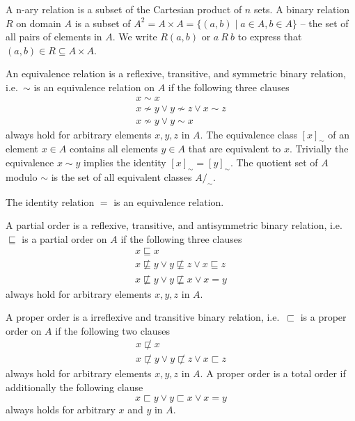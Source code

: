 \begin{definition}
	A n-ary relation is a subset of the Cartesian product of $n$ sets.
	A {\myem binary relation} $R$ on domain $A$ 
	is a subset of $A^2 = A \times A = \{ (a,b) \mid a\in A, b\in A \}$ -- 
	the set of all pairs of elements in $A$.
	We write $R(a,b)$ or $a\ R\ b$ to express that $(a,b)\in R \subseteq A\times A$.
\end{definition}
\begin{definition}
	An {\myem equivalence relation} 
	is a reflexive, transitive, and symmetric binary relation, 
	i.e.~$\sim$ is an equivalence relation on $A$ if the following three clauses
	\begin{align*}
	x\sim x
	\tag*{reflexivivity}
	\\
	x\not\sim y \lor  y \not\sim z \lor x\sim z
	\tag*{transitivity}
	\\
	x\not\sim y \lor y\sim x
	\tag*{symmetry}
	\end{align*}
	always hold for arbitrary elements $x,y,z$ in $A$.
	The {\myem equivalence class} $[x]_\sim$
	of an element $x\in A$ contains all elements $y\in A$ that are equivalent to $x$.
	Trivially the equivalence $x\sim y$ implies the identity $[x]_\sim = [y]_\sim$.
	The quotient set of $A$ modulo $\sim$ is the set of all equivalent classes $A/_{\!\sim}$. 
\end{definition}

\begin{lemma}
	The identity relation $=$ is an equivalence relation.
\end{lemma}

\begin{definition}
	A {\myem partial order} is a reflexive, transitive, and antisymmetric binary relation, 
	i.e.~$\sqsubseteq$ is a partial order on $A$ if
	the following three clauses
	\begin{align*}
	x\sqsubseteq x
	\tag*{reflexivivity}
	\\
	x\not\sqsubseteq y \lor  y \not\sqsubseteq z \lor x\sqsubseteq z
	\tag*{transitivity}
	\\
	x\not\sqsubseteq y \lor y\not\sqsubseteq x \lor x = y
	\tag*{antisymmetry}
	\end{align*}
	always hold for arbitrary elements $x,y,z$ in $A$.
\end{definition}

\begin{definition}
	A {\myem proper order} is a irreflexive and transitive binary relation, 
	i.e.~$\sqsubset$ is a proper order on $A$ if the following two clauses
	\begin{align*}
	x\not\sqsubset x
	\tag*{irreflexivivity}
	\\
	x\not\sqsubset y \lor  y \not\sqsubset z \lor x\sqsubset z
	\tag*{transitivity}
	\end{align*}
	always hold for arbitrary elements $x,y,z$ in $A$.
	A proper order is a {\myem total order} if additionally the following clause
	\[
		x \sqsubset y \lor y \sqsubset x  \lor x=y \tag*{totality}
	\]
	always holds for arbitrary $x$ and $y$ in $A$.
\end{definition}

